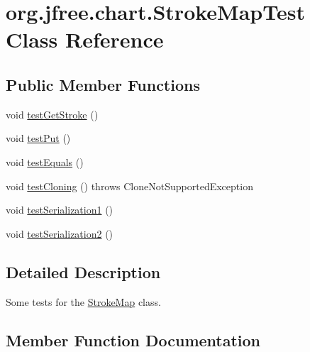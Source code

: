 \hypertarget{classorg_1_1jfree_1_1chart_1_1_stroke_map_test}{}\section{org.\+jfree.\+chart.\+Stroke\+Map\+Test Class Reference}
\label{classorg_1_1jfree_1_1chart_1_1_stroke_map_test}
\subsection*{Public Member Functions}
\begin{DoxyCompactItemize}
\item 
void \mbox{\hyperlink{classorg_1_1jfree_1_1chart_1_1_stroke_map_test_a108a95ffc5be567262f45a48d360cb1d}{test\+Get\+Stroke}} ()
\item 
void \mbox{\hyperlink{classorg_1_1jfree_1_1chart_1_1_stroke_map_test_a2e00cf7746d1ebaa372441e1eddc17f3}{test\+Put}} ()
\item 
void \mbox{\hyperlink{classorg_1_1jfree_1_1chart_1_1_stroke_map_test_ade68fa26e5e6ca32ee6983788a7cf6c3}{test\+Equals}} ()
\item 
void \mbox{\hyperlink{classorg_1_1jfree_1_1chart_1_1_stroke_map_test_a06a6aec2be7e5d8c18da334e1eec2d1f}{test\+Cloning}} ()  throws Clone\+Not\+Supported\+Exception 
\item 
void \mbox{\hyperlink{classorg_1_1jfree_1_1chart_1_1_stroke_map_test_afa31ab4ef78c1da89b80bd77706af8a2}{test\+Serialization1}} ()
\item 
void \mbox{\hyperlink{classorg_1_1jfree_1_1chart_1_1_stroke_map_test_add718e9d10ab4ce58c14e76f0fc72a56}{test\+Serialization2}} ()
\end{DoxyCompactItemize}


\subsection{Detailed Description}
Some tests for the \mbox{\hyperlink{classorg_1_1jfree_1_1chart_1_1_stroke_map}{Stroke\+Map}} class. 

\subsection{Member Function Documentation}
\mbox{\label{classorg_1_1jfree_1_1chart_1_1_stroke_map_test_a06a6aec2be7e5d8c18da334e1eec2d1f}} 

